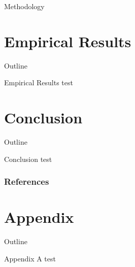 \documentclass[10pt, mathserif, hyperref={hidelinks,colorlinks=true,linkcolor=blue,citecolor=blue},xcolor={dvipsnames}]{beamer}
\begin{document}
\begin{frame}{Methodology}

\end{frame}

\section{Empirical Results}

{   
    \begin{frame}{Outline}
    \tableofcontents[currentsection]
    \end{frame}
}

\begin{frame}[fragile]{Empirical Results}
    test
\end{frame}

\section{Conclusion}

{
    \begin{frame}{Outline}
    \tableofcontents[currentsection]
    \end{frame}}

\begin{frame}{Conclusion}
    test
\end{frame}

\begin{frame}[t,allowframebreaks]
    \frametitle{References}
    
\end{frame}

\section{Appendix}

{
    \begin{frame}{Outline}
    \tableofcontents[currentsection]
    \end{frame}
}

\begin{frame}{Appendix A}
    test
\end{frame}
\end{document}
